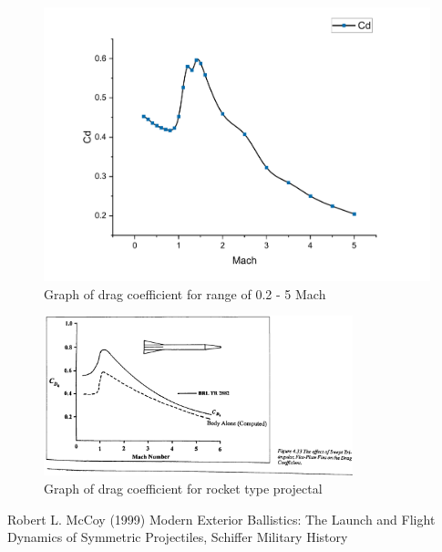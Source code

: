 \documentclass{article}
\begin{document}
\begin{figure}[H]
\centering
\includegraphics[width=\textwidth]{CD50}
\caption{Graph of drag coefficient for range of 0.2 - 5 Mach}
\label{fig:CD50}
\end{figure}

\begin{figure}[H]
\centering
\includegraphics[width=0.8\textwidth]{MEBgraphRocket}
\caption{Graph of drag coefficient for rocket type projectal\cite{MEB}}
\label{fig:MEBgraphRocket}
\end{figure}



\begin{thebibliography}{1}
	Robert L. McCoy (1999) Modern Exterior Ballistics: The Launch and Flight Dynamics of Symmetric Projectiles, Schiffer Military History
\end{thebibliography}
\end{document}
